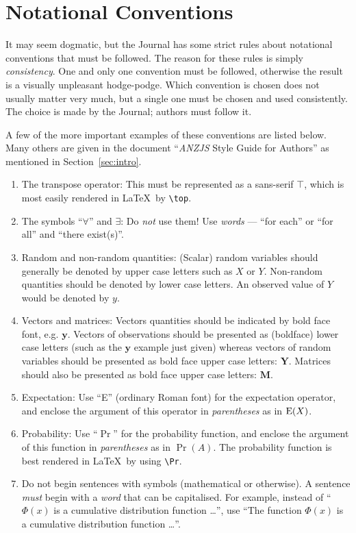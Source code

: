 \documentclass[times, doublespace]{anzsauth}
\newcommand{\by}{\mbox{$\boldsymbol{y}$}}
\newcommand{\bY}{\mbox{$\boldsymbol{Y}$}}
\newcommand{\bM}{\mbox{$\boldsymbol{M}$}}
\begin{document}
\section{Notational Conventions}
\label{sec:noteConv}
It may seem dogmatic, but the Journal has some strict rules
about notational conventions that must be followed.  The reason
for these rules is simply \emph{consistency}.  One and only one
convention must be followed, otherwise the result is a visually
unpleasant hodge-podge.  Which convention is chosen does not
usually matter very much, but a single one must be chosen and
used consistently.  The choice is made by the Journal; authors
must follow it.

A few of the more important examples of these conventions are
listed below.  Many others are given in the document ``\textit{ANZJS}
Style Guide for Authors'' as mentioned in Section~\ref{sec:intro}.
\begin{enumerate}
\item The transpose operator:  This must be represented as a
sans-serif $\top$, which is most easily rendered in \LaTeX\
by \verb!\top!.
\item The symbols ``$\forall$'' and $\exists$: Do \emph{not}
use them!  Use \emph{words} --- ``for each'' or ``for all'' and
``there exist(s)''.
\item Random and non-random quantities:  (Scalar) random variables
should generally be denoted by upper case letters such as $X$ or $Y$.
Non-random quantities should be denoted by lower case letters. An
observed value of $Y$ would be denoted by $y$.
\item Vectors and matrices:  Vectors quantities should be indicated
by bold face font, e.g. $\by$.  Vectors of observations should
be presented as (boldface) lower case letters (such as the $\by$ example
just given) whereas vectors
of random variables should be presented as bold face upper case
letters: $\bY$.  Matrices should also be presented as bold face
upper case letters: $\bM$.
\item Expectation:  Use ``E'' (ordinary Roman font) for the
expectation operator, and enclose the argument of this operator in
\emph{parentheses} as in ${\rm E}(X)$.
\item Probability: Use ``$\Pr$'' for the probability function,
and enclose the argument of this function in \emph{parentheses}
as in $\Pr(A)$.  The probability function is best rendered
in \LaTeX\ by using \verb!\Pr!.
\item Do not begin sentences with symbols (mathematical or
otherwise).  A sentence \emph{must} begin with a \emph{word}
that can be capitalised. For example, instead of ``$\Phi(x)$ is
a cumulative distribution function \ldots'', use ``The function
$\Phi(x)$ is a cumulative distribution function \ldots''.
\end{enumerate}
\end{document}
